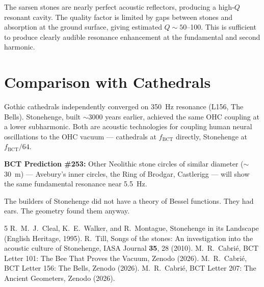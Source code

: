 \documentclass[aps,prl,twocolumn,superscriptaddress]{revtex4-2}
\begin{document}
The sarsen stones are nearly perfect acoustic reflectors, producing a high-$Q$ resonant cavity. The quality factor is limited by gaps between stones and absorption at the ground surface, giving estimated $Q \sim 50$--100. This is sufficient to produce clearly audible resonance enhancement at the fundamental and second harmonic.

\section{Comparison with Cathedrals}

Gothic cathedrals independently converged on 350~Hz resonance (L156, The Bells). Stonehenge, built $\sim$3000 years earlier, achieved the same OHC coupling at a lower subharmonic. Both are acoustic technologies for coupling human neural oscillations to the OHC vacuum --- cathedrals at $f_{\mathrm{BCT}}$ directly, Stonehenge at $f_{\mathrm{BCT}}/64$.

\textbf{BCT Prediction \#253:} Other Neolithic stone circles of similar diameter ($\sim$30~m) --- Avebury's inner circles, the Ring of Brodgar, Castlerigg --- will show the same fundamental resonance near 5.5~Hz.

\begin{acknowledgments}
The builders of Stonehenge did not have a theory of Bessel functions. They had ears. The geometry found them anyway.
\end{acknowledgments}

\begin{thebibliography}{5}
 R.~M.~J.~Cleal, K.~E.~Walker, and R.~Montague, Stonehenge in its Landscape (English Heritage, 1995).
 R.~Till, Songs of the stones: An investigation into the acoustic culture of Stonehenge, IASA Journal \textbf{35}, 28 (2010).
 M.~R.~Cabri\'e, BCT Letter 101: The Bee That Proves the Vacuum, Zenodo (2026).
 M.~R.~Cabri\'e, BCT Letter 156: The Bells, Zenodo (2026).
 M.~R.~Cabri\'e, BCT Letter 207: The Ancient Geometers, Zenodo (2026).
\end{thebibliography}
\end{document}
